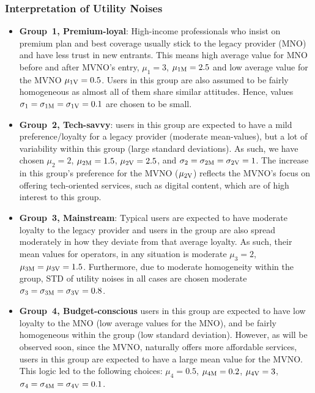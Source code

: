 \documentclass[12pt, draftclsnofoot, onecolumn]{IEEEtran}
\begin{document}
		\subsubsection{Interpretation of Utility Noises}
		\begin{itemize}
			\item\textbf{Group~1, Premium-loyal}: High-income professionals who insist on premium plan and best coverage usually stick to the legacy provider (MNO) and have less trust in new entrants. This means high average value for MNO before and after MVNO's entry, $\mu_1=3$, $\mu_{1\rm M}=2.5$ and low average value for the MVNO $\mu_{1\rm V}=0.5$. Users in this group are also assumed to be fairly homogeneous as almost all of them share similar attitudes. Hence, values $\sigma_1=\sigma_{1\rm M}=\sigma_{1\rm V}=0.1$ are chosen to be small.
			\item \textbf{Group~2, Tech-savvy}: users in this group are expected to have a mild preference/loyalty for a legacy provider (moderate mean-values), but a lot of variability within this group (large standard deviations). As such, we have chosen $\mu_2=2$, $\mu_{2\rm M}=1.5$, $\mu_{2\rm V}=2.5$, and $\sigma_{2}=\sigma_{2\rm M}=\sigma_{2\rm V}=1$. The increase in this group's preference for the MVNO ($\mu_{2\rm V}$) reflects the MVNO's focus on offering tech-oriented services, such as digital content, which are of high interest to this group.
			\item\textbf{Group~3, Mainstream}: Typical users are expected to have moderate loyalty to the legacy provider and users in the group are also spread moderately in how they deviate from that average loyalty. As such, their mean values for operators, in any situation is moderate $\mu_3=2$, $\mu_{3\rm M}=\mu_{3\rm V}=1.5$. Furthermore, due to moderate homogeneity within the group, STD of utility noises in all cases are chosen moderate $\sigma_{3}=\sigma_{3\rm M}=\sigma_{3\rm V}=0.8$. 
			
			\item \textbf{Group~4, Budget-conscious} users in this group are expected to have low loyalty to the MNO (low average values for the MNO), and be fairly homogeneous within the group (low standard deviation). However, as will be observed soon, since the MVNO, naturally offers more affordable services, users in this group are expected to have a large mean value for the MVNO. This logic led to the following choices:  $\mu_4=0.5$, $\mu_{4\rm M}=0.2$, $\mu_{4\rm V}=3$, $\sigma_{4}=\sigma_{4\rm M}=\sigma_{4\rm V}=0.1$.
		\end{itemize}
		
\end{document}
